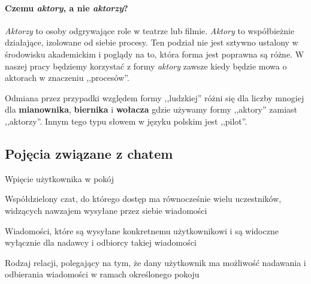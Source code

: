 \paragraph*{Czemu \emph{aktory}, a nie \emph{aktorzy}?}
\label{glossary_actors}

\emph{Aktorzy} to osoby odgrywające role w teatrze lub filmie. \emph{Aktory} to
współbieżnie działające, izolowane od siebie procesy. Ten podział nie jest
sztywno ustalony w środowisku akademickim i poglądy na to, która forma jest
poprawna są różne. W naszej pracy będziemy korzystać z formy \emph{aktory}
zawsze kiedy będzie mowa o aktorach w znaczeniu ,,procesów''.

Odmiana przez przypadki względem formy ,,ludzkiej'' różni się dla liczby mnogiej
dla \textbf{mianownika}, \textbf{biernika} i \textbf{wołacza} gdzie używamy
formy ,,aktory'' zamiast ,,aktorzy''. Innym tego typu słowem w języku polskim
jest ,,pilot''.

\subsection{Pojęcia związane z chatem}
\label{slownik_pojec_chatu}

\begin{labeling}{Wpięcie użytkownika w pokój}
    \item[Pokój] Współdzielony czat, do którego dostęp ma równocześnie wielu uczestników, widzących nawzajem
        wysyłane przez siebie wiadomości
    \item[Wiadomości prywatne] Wiadomości, które są wysyłane konkretnemu użytkownikowi i są widoczne wyłącznie
        dla nadawcy i odbiorcy takiej wiadomości
    \item[Wpięcie użytkownika w pokój] Rodzaj relacji, polegający na tym, że dany użytkownik ma możliwość
        nadawania i odbierania wiadomości w ramach określonego pokoju
\end{labeling}
